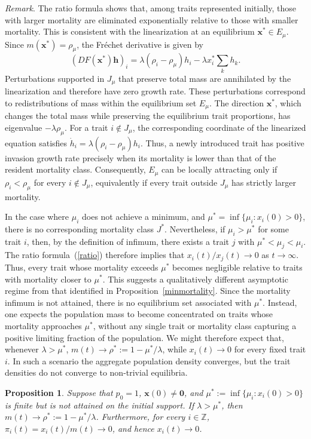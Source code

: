 \documentclass[12pt]{article}
\newtheorem{proposition}{Proposition}
\newcommand{\Z}{\ensuremath{\mathbb Z}}
\newcommand{\bh}{\boldsymbol{h}}
\newcommand{\bzero}{\boldsymbol{0}}
\newcommand{\bx}{\boldsymbol{x}}
\begin{document}
\medskip
\noindent
\emph{Remark}.
The ratio formula shows that, among traits represented initially,
those with larger mortality are eliminated exponentially relative to
those with smaller mortality. This is consistent with the linearization
at an equilibrium $\bx^*\in E_\mu$. Since $m(\bx^*)=\rho_\mu$, the
Fr\'echet derivative is given by
$$
(DF(\bx^*)\bh)_i
=
\lambda(\rho_i-\rho_\mu)h_i
-\lambda x_i^*\sum_k h_k.
$$
Perturbations supported in $J_\mu$ that preserve total mass are
annihilated by the linearization and therefore have zero growth rate.
These perturbations correspond to redistributions of mass within the
equilibrium set $E_\mu$. The direction $\bx^*$, which changes the total
mass while preserving the equilibrium trait proportions, has eigenvalue
$-\lambda\rho_\mu$.
For a trait $i\notin J_\mu$, the corresponding coordinate of the
linearized equation satisfies
$\dot h_i=\lambda(\rho_i-\rho_\mu)h_i$. Thus, a newly introduced trait
has positive invasion growth rate precisely when its mortality is lower
than that of the resident mortality class. Consequently, $E_\mu$ can
be locally attracting only if $\rho_i<\rho_\mu$ for every
$i\notin J_\mu$, equivalently if every trait outside $J_\mu$ has
strictly larger mortality.

\medskip
In the case where $\mu_i$ does not achieve a minimum, and
$\mu^*=\inf\{\mu_i: x_i(0)>0\}$, there is no corresponding mortality
class $J^*$. Nevertheless, if $\mu_i>\mu^*$ for some trait $i$, then, by
the definition of infimum, there exists a trait $j$ with
$\mu^*<\mu_j<\mu_i$. The ratio formula~(\ref{ratio}) therefore implies that
$x_i(t)/x_j(t)\to 0$ as $t\to\infty$. Thus, every trait whose mortality
exceeds $\mu^*$ becomes negligible relative to traits with mortality
closer to $\mu^*$. This suggests a qualitatively different asymptotic
regime from that identified in Proposition~\ref{minmortality}. Since the
mortality infimum is not attained, there is no equilibrium set
associated with $\mu^*$. Instead, one expects the population mass to
become concentrated on traits whose mortality approaches $\mu^*$,
without any single trait or mortality class capturing a positive
limiting fraction of the population. We might therefore expect that,
whenever $\lambda>\mu^*$, $m(t)\to \rho^*:=1-{\mu^*}/{\lambda}$, while
$x_i(t)\to 0$ for every fixed trait $i$. In such a scenario the
aggregate population density converges, but the
trait densities do not converge to non-trivial equilibria.

\begin{proposition}
\label{notattained}
Suppose that $p_0=1$, $\bx(0)\neq\bzero$, and
$\mu^*:=\inf\{\mu_i:x_i(0)>0\}$
is finite but is not attained on the initial support. If
$\lambda>\mu^*$, then $m(t)\to\rho^*:=1-\mu^*/\lambda$.
Furthermore, for every $i\in\Z$,
$\pi_i(t)=x_i(t)/m(t)\to0$, and hence $x_i(t)\to0$.
\end{proposition}
\end{document}
